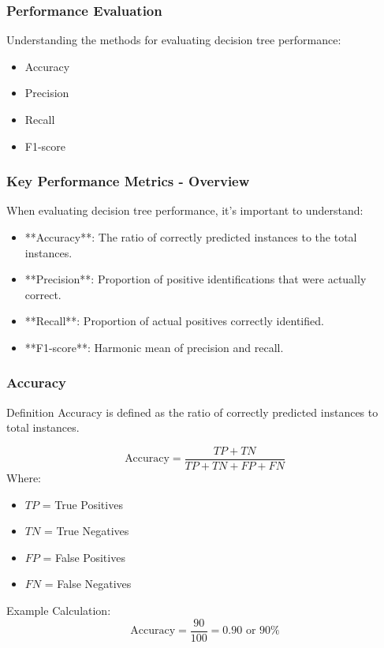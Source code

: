 \documentclass[aspectratio=169]{beamer}
\begin{document}
\begin{frame}[fragile]
    \frametitle{Performance Evaluation}
    Understanding the methods for evaluating decision tree performance:
    \begin{itemize}
        \item Accuracy
        \item Precision
        \item Recall
        \item F1-score
    \end{itemize}
\end{frame}

\begin{frame}[fragile]
    \frametitle{Key Performance Metrics - Overview}
    When evaluating decision tree performance, it’s important to understand:
    \begin{itemize}
        \item **Accuracy**: The ratio of correctly predicted instances to the total instances.
        \item **Precision**: Proportion of positive identifications that were actually correct.
        \item **Recall**: Proportion of actual positives correctly identified.
        \item **F1-score**: Harmonic mean of precision and recall.
    \end{itemize}
\end{frame}

\begin{frame}[fragile]
    \frametitle{Accuracy}
    \begin{block}{Definition}
        Accuracy is defined as the ratio of correctly predicted instances to total instances.
    \end{block}
    \begin{equation}
        \text{Accuracy} = \frac{TP + TN}{TP + TN + FP + FN}
    \end{equation}
    Where:
    \begin{itemize}
        \item \(TP\) = True Positives
        \item \(TN\) = True Negatives
        \item \(FP\) = False Positives
        \item \(FN\) = False Negatives
    \end{itemize}
    Example Calculation:
    \begin{equation}
        \text{Accuracy} = \frac{90}{100} = 0.90 \text{ or } 90\%
    \end{equation}
\end{frame}
\end{document}
